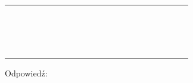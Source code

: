 \documentclass[10pt]{article}
\begin{document}
\begin{center}
\begin{tabular}{|c|c|c|c|c|c|c|c|c|c|c|c|c|c|c|c|c|c|c|c|c|c|}
\hline
 &  &  &  &  &  &  &  &  &  &  &  &  &  &  &  &  &  &  &  &  &  \\
\hline
 &  &  &  &  &  &  &  &  &  &  &  &  &  &  &  &  &  &  &  &  &  \\
\hline
 &  &  &  &  &  &  &  &  &  &  &  &  &  &  &  &  &  &  &  &  &  \\
\hline
 &  &  &  &  &  &  &  &  &  &  &  &  &  &  &  &  &  &  &  &  &  \\
\hline
 &  &  &  &  &  &  &  &  &  &  &  &  &  &  &  &  &  &  &  &  &  \\
\hline
 &  &  &  &  &  &  &  &  &  &  &  &  &  &  &  &  &  &  &  &  &  \\
\hline
 &  &  &  &  &  &  &  &  &  &  &  &  &  &  &  &  &  &  &  &  &  \\
\hline
 &  &  &  &  &  &  &  &  &  &  &  &  &  &  &  &  &  &  &  &  &  \\
\hline
 &  &  &  &  &  &  &  &  &  &  &  &  &  &  &  &  &  &  &  &  &  \\
\hline
 &  &  &  &  &  &  &  &  &  &  &  &  &  &  &  &  &  &  &  &  &  \\
\hline
 &  &  &  &  &  &  &  &  &  &  &  &  &  &  &  &  &  &  &  &  &  \\
\hline
 &  &  &  &  &  &  &  &  &  &  &  &  &  &  &  &  &  &  &  &  &  \\
\hline
 &  &  &  &  &  &  &  &  &  &  &  &  &  &  &  &  &  &  &  &  &  \\
\hline
 &  &  &  &  &  &  &  &  &  &  &  &  &  &  &  &  &  &  &  &  &  \\
\hline
 &  &  &  &  &  &  &  &  &  &  &  &  &  &  &  &  &  &  &  &  &  \\
\hline
 &  &  &  &  &  &  &  &  &  &  &  &  &  &  &  &  &  &  &  &  &  \\
\hline
 &  &  &  &  &  &  &  &  &  &  &  &  &  &  &  &  &  &  &  &  &  \\
\hline
 &  &  &  &  &  &  &  &  &  &  &  &  &  &  &  &  &  &  &  &  &  \\
\hline
\end{tabular}
\end{center}

Odpowiedź: \(\qquad\)
\end{document}
